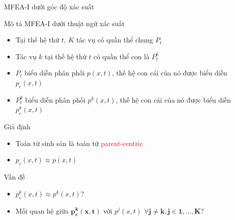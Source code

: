 	\begin{frame}{MFEA-I dưới góc độ xác suất}
		\begin{itemize}
	    	\begin{block}{Mô tả MFEA-I dưới thuật ngữ xác suất}
        		\begin{itemize}
        		\setlength\itemsep{0.03em}
                \item Tại thế hệ thứ $t$, $K$ tác vụ có quần thể chung $P_t$
                \item Tác vụ $k$ tại thế hệ thứ $t$ có quần thể con là $P_t^k$
                \item $P_t$ biểu diễn phân phối $p(x,t)$, thế hệ con cái của nó được biểu diễn $p_c(x,t)$
                \item $P_t^k$ biểu diễn phân phối $p^k(x,t)$, thế hệ con cái của nó được biểu diễn $p_c^k(x,t)$
                \end{itemize}
			\end{block}
			\begin{block}{Giả định}
                \begin{itemize}
                \setlength\itemsep{0.03em}
                \item Toán tử sinh sản là toán tử \textcolor{red}{parent-centric}
                \item $p_c(x,t) \approx p(x,t)$
                \end{itemize}
			\end{block}
			\begin{block}{Vấn đề}
			    \begin{itemize}
			    \item $p_c^k(x,t) \approx p^k(x,t)$?
                \item Mối quan hệ giữa $\mathbf{p_c^k(x,t)}$ với $p^j(x,t)$ $\mathbf{\forall j \neq k, j \in {1, ..., K}}$?
                \end{itemize}
			\end{block}
		\end{itemize}
	\end{frame}
